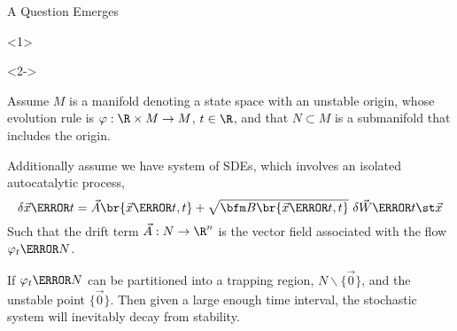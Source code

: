 \documentclass[aspectratio=169, onlytextwidth,  notheorems, sOuRcEs, fleqn, leqno, ]{RUCPresentation}
\begin{document}
\begin{frame}{ A Question Emerges }

%
%
%
%
%

    \vspace{1em}

    \begin{onlyenv}<1>

    \end{onlyenv}

    \begin{onlyenv}<2->
        \begin{proposition}[name={Stochastic Stability Decay}] \label{prp.ssd}

            Assume \(M\) is a manifold denoting a state space with an unstable origin,
            whose {evolution rule} is \(\varphi:\R\times M\to M\),
            \(t\in\R\), and that \(N\subset M\) is a submanifold that includes the origin.

            Additionally assume we have system of SDEs,
            which involves an isolated autocatalytic process,
            \begin{equation*}
                \hfill
                \delta \vec{x}\of t
                = \vec{A}\br{\vec{x}\of t, t}
                + \sqrt{\bfm B\br{\vec{x}\of t, t}} \ \delta{\vec{W}\of{t\st \vec{x}}}
                \hfill
            \end{equation*}
            Such that the drift term \(\vec{A}:N\to\R^n\) is the vector field
            associated with the flow \(\varphi_t\of N\).

            If \(\varphi_t\of{N}\) can be partitioned into a trapping region,
            \(N\backslash\{\vec{0}\}\), and the unstable point \(\{\vec{0}\}\).
            Then given a large enough time interval,
            the stochastic system will inevitably decay from stability.

        \end{proposition}
    \end{onlyenv}

\end{frame}
\end{document}
